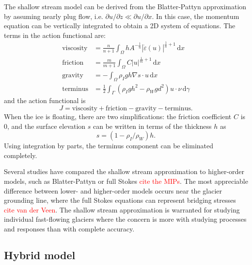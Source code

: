 \documentclass{article}
\theoremstyle{definition}
\theoremstyle{plain}
\newcommand{\ud}{\hspace{2pt}\mathrm{d}}
\begin{document}
The shallow stream model can be derived from the Blatter-Pattyn approximation by assuming nearly plug flow, i.e. $\partial u/\partial z \ll \partial u/\partial x$.
In this case, the momentum equation can be vertically integrated to obtain a 2D system of equations.
The terms in the action functional are:
\begin{align}
    \text{viscosity} & = \frac{n}{n + 1}\int_\Omega hA^{-\frac{1}{n}}|\dot\varepsilon(u)|^{\frac{1}{n} + 1}\ud x \\
    \text{friction} & = \frac{m}{m + 1}\int_\Omega C|u|^{\frac{1}{m} + 1}\ud x \\
    \text{gravity} & = -\int_\Omega\rho_I gh\nabla s\cdot u\ud x \\
    \text{terminus} & = \frac{1}{2}\int_\Gamma(\rho_I gh^2 - \rho_Wgd^2)u\cdot \nu\ud\gamma
\end{align}
and the action functional is
\begin{equation}
    J = \text{viscosity} + \text{friction} - \text{gravity} - \text{terminus}.
\end{equation}
When the ice is floating, there are two simplifications: the friction coefficient $C$ is 0, and the surface elevation $s$ can be written in terms of the thickness $h$ as
\begin{equation}
    s = (1 - \rho_I / \rho_W)h.
\end{equation}
Using integration by parts, the terminus component can be eliminated completely.

Several studies have compared the shallow stream approximation to higher-order models, such as Blatter-Pattyn or full Stokes \textcolor{red}{cite the MIPs}.
The most appreciable difference between lower- and higher-order models occurs near the glacier grounding line, where the full Stokes equations can represent bridging stresses \textcolor{red}{cite van der Veen}.
The shallow stream approximation is warranted for studying individual fast-flowing glaciers where the concern is more with studying processes and responses than with complete accuracy.


\subsection{Hybrid model} \label{sec:physics-hybrid-model}
\end{document}
